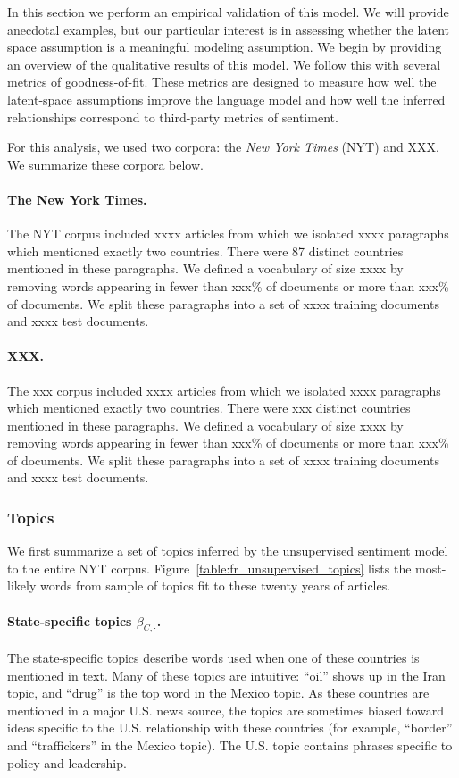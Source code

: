 In this section we perform an empirical validation of this model.  We
will provide anecdotal examples, but our particular interest is in
assessing whether the latent space assumption is a meaningful modeling
assumption.  We begin by providing an overview of the qualitative
results of this model.  We follow this with several metrics of
goodness-of-fit.  These metrics are designed to measure how well the
latent-space assumptions improve the language model and how well the
inferred relationships correspond to third-party metrics of sentiment.

For this analysis, we used two corpora: the \emph{New York Times}
(NYT) and XXX.  We summarize these corpora below.

\paragraph{The New York Times.}  The NYT corpus included xxxx articles from which we isolated xxxx paragraphs which mentioned exactly two countries. There were 87 distinct countries mentioned in these paragraphs.  We defined a vocabulary of size xxxx by removing words appearing in fewer than xxx\% of documents or more than xxx\% of documents.  We split these paragraphs into a set of xxxx training documents and xxxx test documents.

\paragraph{XXX.}  The xxx corpus included xxxx articles from which we isolated xxxx paragraphs which mentioned exactly two countries. There were xxx distinct countries mentioned in these paragraphs.  We defined a vocabulary of size xxxx by removing words appearing in fewer than xxx\% of documents or more than xxx\% of documents.  We split these paragraphs into a set of xxxx training documents and xxxx test documents.

\subsubsection*{Topics}
We first summarize a set of topics inferred by the unsupervised
sentiment model to the entire NYT corpus.
Figure~\ref{table:fr_unsupervised_topics} lists the most-likely words
from sample of topics fit to these twenty years of articles.

\paragraph{State-specific topics $\beta_{C,\cdot}$.}  The state-specific topics describe words used when one of these countries is mentioned in text.  Many of these topics are intuitive: ``oil'' shows up in the Iran topic, and ``drug'' is the top word in the Mexico topic.  As these countries are mentioned in a major U.S. news source, the topics are sometimes biased toward ideas specific to the U.S. relationship with these countries (for example, ``border'' and ``traffickers'' in the Mexico topic).  The U.S. topic contains phrases specific to policy and leadership.

